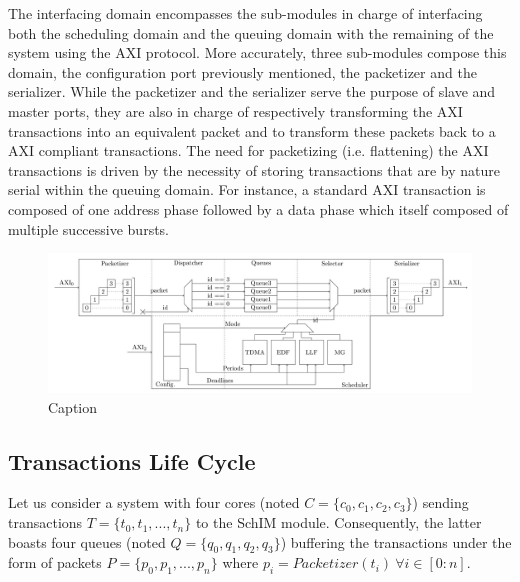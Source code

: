         The interfacing domain encompasses the sub-modules in charge of interfacing both the scheduling domain and the queuing domain with the remaining of the system using the AXI protocol.
        More accurately, three sub-modules compose this domain, the configuration port previously mentioned, the packetizer and the serializer.
        While the packetizer and the serializer serve the purpose of slave and master ports, they are also in charge of respectively transforming the AXI transactions into an equivalent packet and to transform these packets back to a AXI compliant transactions.
        The need for packetizing (i.e. flattening) the AXI transactions is driven by the necessity of storing transactions that are by nature serial within the queuing domain.
        For instance, a standard AXI transaction is composed of one address phase followed by a data phase which itself composed of multiple successive bursts.

        \begin{figure}
            \centering
            \includegraphics[scale=0.08]{images/MemorEDF_module_schema.png}
            \caption{Caption}
            \label{fig:MemorEDF_module_schema}
        \end{figure}

    \subsection{Transactions Life Cycle}
        \label{subsec:transaction-life-cycle}
        Let us consider a system with four cores (noted $C = \{c_{0}, c_{1}, c_{2}, c_{3}\}$) sending transactions $T = \{t_{0}, t_{1}, ..., t_{n}\}$ to the SchIM module.
        Consequently, the latter boasts four queues (noted $Q = \{q_{0}, q_{1}, q_{2}, q_{3}\}$) buffering the transactions under the form of packets $P = \{p_{0}, p_{1}, ..., p_{n}\}$ where $p_{i} = Packetizer(t_{i})~\forall i \in [0 : n]$.

